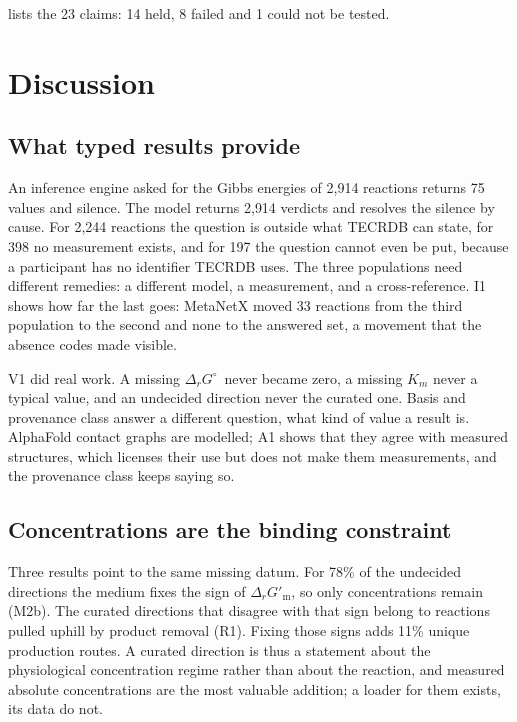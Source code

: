 \documentclass[5p]{elsarticle}
\theoremstyle{definition}
\theoremstyle{plain}
\newcommand{\DG}{\ensuremath{\Delta_r G^\circ}}
\newcommand{\DGm}{\ensuremath{\Delta_r G'_{\mathrm{m}}}}
\begin{document}
 lists the 23 claims: 14 held, 8 failed and 1 could not be tested.


\section{Discussion}
\label{sec:discussion}

\subsection{What typed results provide}
\label{sec:disc-verdicts}

An inference engine asked for the Gibbs energies of 2{,}914 reactions returns 75 values and silence.
The model returns 2{,}914 verdicts and resolves the silence by cause.
For 2{,}244 reactions the question is outside what TECRDB can state, for 398 no measurement exists, and for 197 the question cannot even be put, because a participant has no identifier TECRDB uses.
The three populations need different remedies: a different model, a measurement, and a cross-reference.
I1 shows how far the last goes: MetaNetX moved 33 reactions from the third population to the second and none to the answered set, a movement that the absence codes made visible.

V1 did real work.
A missing \DG\ never became zero, a missing $K_m$ never a typical value, and an undecided direction never the curated one.
Basis and provenance class answer a different question, what kind of value a result is.
AlphaFold contact graphs are modelled; A1 shows that they agree with measured structures, which licenses their use but does not make them measurements, and the provenance class keeps saying so.

\subsection{Concentrations are the binding constraint}
\label{sec:disc-conc}

Three results point to the same missing datum.
For 78\% of the undecided directions the medium fixes the sign of \DGm, so only concentrations remain (M2b).
The curated directions that disagree with that sign belong to reactions pulled uphill by product removal (R1).
Fixing those signs adds 11\% unique production routes.
A curated direction is thus a statement about the physiological concentration regime rather than about the reaction, and measured absolute concentrations \citep{bennett2009absolute,park2016concentrations} are the most valuable addition; a loader for them exists, its data do not.
\end{document}
